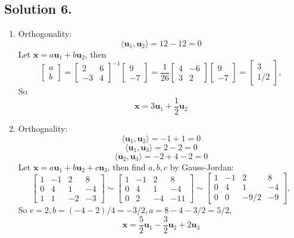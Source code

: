 \documentclass{article}
\begin{document}
\subsection*{Solution 6.}
\begin{enumerate}[label=(\arabic*)]
    \item Orthogonality:\[\langle \mathbf{u}_1,\mathbf{u}_2\rangle=12-12=0\]
    Let $\mathbf{x}=a\mathbf{u}_1+b\mathbf{u}_2$, then
    \[\left[\begin{array}{r}a\\b\end{array}\right]=\left[\begin{array}{rr}2&6\\-3&4\end{array}\right]^{-1}\left[\begin{array}{r}9\\-7\end{array}\right]=\frac{1}{26}\left[\begin{array}{rr}4&-6\\3&2\end{array}\right]\left[\begin{array}{r}9\\-7\end{array}\right]=\left[\begin{array}{r}3\\1/2\end{array}\right],\]
    So
    \[\mathbf{x}=3\mathbf{u}_1+\frac{1}{2}\mathbf{u}_2\]
    \item Orthognality:
    \[\langle \mathbf{u}_1,\mathbf{u}_2\rangle=-1+1=0\]
    \[\langle \mathbf{u}_1,\mathbf{u}_3\rangle=2-2=0\]
    \[\langle \mathbf{u}_2,\mathbf{u}_3\rangle=-2+4-2=0\]
    Let $\mathbf{x}=a\mathbf{u}_1+b\mathbf{u}_2+c\mathbf{u}_3$, then find $a,b,c$ by Gauss-Jordan:
    \[\left[\begin{array}{rrrr}
1 & -1 & 2 & 8 \\
0 &  4 & 1 & -4\\
1 & 1 & -2 & -3
    \end{array}\right]\sim\left[\begin{array}{rrrr}
1 & -1 & 2 & 8 \\
0 &  4 & 1 & -4\\
0 & 2 & -4 & -11
    \end{array}\right]\sim\left[\begin{array}{rrrr}
1 & -1 & 2 & 8 \\
0 &  4 & 1 & -4\\
0 & 0 & -9/2 & -9
    \end{array}\right],\]
    So $c=2,b=(-4-2)/4=-3/2,a=8-4-3/2=5/2$,
    \[\mathbf{x}=\frac{5}{2}\mathbf{u}_1-\frac{3}{2}\mathbf{u}_2+2\mathbf{u}_3\]
\end{enumerate}
\end{document}
